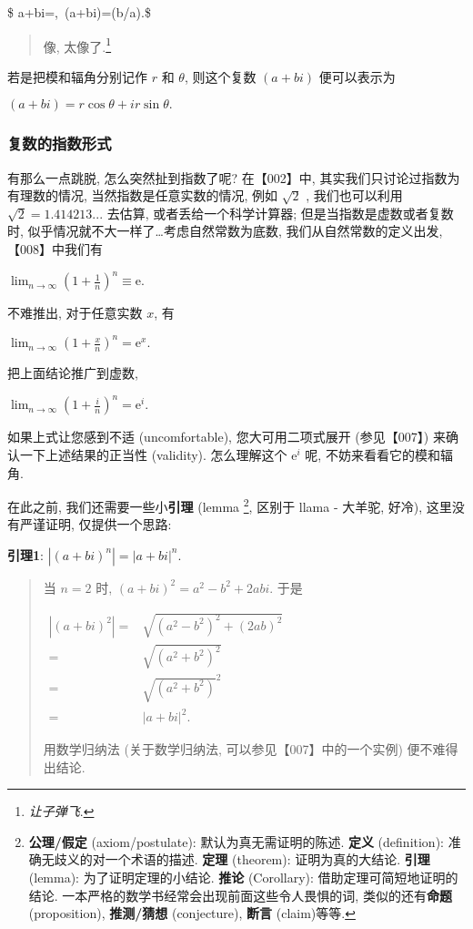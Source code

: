 \$ \textbar a+bi\textbar=,~\arg(a+bi)=\arctan (b/a).\$

\begin{quote}
像, 太像了.\footnote{\emph{让子弹飞}.}
\end{quote}

若是把模和辐角分别记作 \(r\) 和 \(\theta\), 则这个复数 \((a+bi)\)
便可以表示为

\((a+bi)=r\cos\theta+ir\sin\theta.\)

\hypertarget{ux590dux6570ux7684ux6307ux6570ux5f62ux5f0f}{%
\subsubsection{复数的指数形式}\label{ux590dux6570ux7684ux6307ux6570ux5f62ux5f0f}}

有那么一点跳脱, 怎么突然扯到指数了呢? 在【002】中,
其实我们只讨论过指数为有理数的情况, 当然指数是任意实数的情况, 例如
\(\sqrt{2}\) , 我们也可以利用 \(\sqrt{2}=1.414213...\) 去估算,
或者丢给一个科学计算器; 但是当指数是虚数或者复数时,
似乎情况就不大一样了\ldots 考虑自然常数为底数, 我们从自然常数的定义出发,
【008】中我们有

\(\lim_{n\rightarrow\infty}\left(1+\frac{1}{n}\right)^n\equiv\mathrm{e}.\)

不难推出, 对于任意实数 \(x\), 有

\(\lim_{n\rightarrow\infty}\left(1+\frac{x}{n}\right)^n=\mathrm{e}^x.\)

把上面结论推广到虚数,

\(\lim_{n\rightarrow\infty}\left(1+\frac{i}{n}\right)^n=\mathrm{e}^i.\)

如果上式让您感到不适 (uncomfortable), 您大可用二项式展开 (参见【007】)
来确认一下上述结果的正当性 (validity). 怎么理解这个 \(\mathrm{e}^i\) 呢,
不妨来看看它的模和辐角.

在此之前, 我们还需要一些小\textbf{引理} (lemma \footnote{\textbf{公理/假定}
  (axiom/postulate): 默认为真无需证明的陈述. \textbf{定义} (definition):
  准确无歧义的对一个术语的描述. \textbf{定理} (theorem):
  证明为真的大结论. \textbf{引理} (lemma): 为了证明定理的小结论.
  \textbf{推论} (Corollary): 借助定理可简短地证明的结论.
  一本严格的数学书经常会出现前面这些令人畏惧的词,
  类似的还有\textbf{命题} (proposition), \textbf{推测/猜想}
  (conjecture), \textbf{断言} (claim)等等.}, 区别于 llama - 大羊驼,
好冷), 这里没有严谨证明, 仅提供一个思路:

\textbf{引理1}: \(\boxed{|(a+bi)^n|=|a+bi|^n}\).

\begin{quote}
当 \(n=2\) 时, \((a+bi)^2=a^2-b^2+2abi\). 于是

\(\begin{aligned}|(a+bi)^2|=&\sqrt{(a^2-b^2)^2+(2ab)^2}\\=&\sqrt{(a^2+b^2)^2}\\=&\sqrt{(a^2+b^2)}^2\\=&|a+bi|^2.\end{aligned}\)

用数学归纳法 (关于数学归纳法, 可以参见【007】中的一个实例)
便不难得出结论.
\end{quote}

